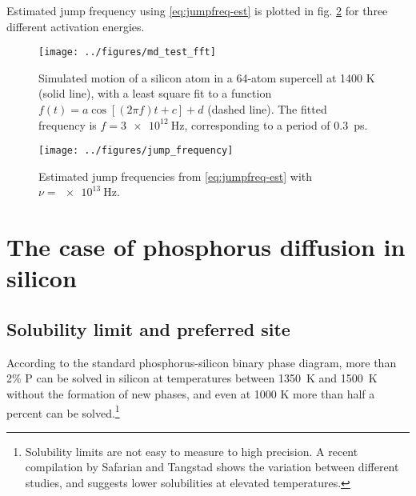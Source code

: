 \documentclass[11pt,bibliography=totoc,index=totoc]{scrbook}   %
\newcommand{\comment}[1]{\hl{#1}}
\begin{document}
Estimated jump frequency using \eqref{eq:jumpfreq-est} is plotted in fig. \ref{fig:jumpfreq-est} for three different activation energies.

\begin{figure}[htbp]
  \begin{center}
    \texttt{[image: ../figures/md\_test\_fft]}
  \end{center}
  \caption{
    Simulated motion of a silicon atom in a 64-atom supercell at 1400 K (solid line), 
    with a least square fit to a function $f(t) = a \cos[(2\pi f)t + c] + d$ (dashed line). 
    The fitted frequency is $f=\SI{3e12}{\hertz}$, corresponding to a period of 0.3~ps.
  }
  \label{fig:simple-vibration}
\end{figure}

\begin{figure}[htbp]
  \begin{center}
    \texttt{[image: ../figures/jump\_frequency]}
  \end{center}
  \caption{Estimated jump frequencies from \eqref{eq:jumpfreq-est} with $\nu=\SI{e13}{\hertz}$.}
  \label{fig:jumpfreq-est}
\end{figure}



%
\section{The case of phosphorus diffusion in silicon}\label{sec:P}
%

%
\subsection{Solubility limit and preferred site}\label{sec:PSolubility}
%

According to the standard phosphorus-silicon binary phase diagram,\cite{PSiPhaseDiagram} more than 2\% P can be solved in silicon at temperatures between \SI{1350}{\kelvin} and \SI{1500}{\kelvin} without the formation of new phases, and even at 1000 K more than half a percent can be solved.\footnote{Solubility limits are not easy to measure to high precision. A recent compilation by Safarian and Tangstad shows the variation between different studies, and suggests lower solubilities at elevated temperatures.\cite{Safarian:2011}}
\end{document}

